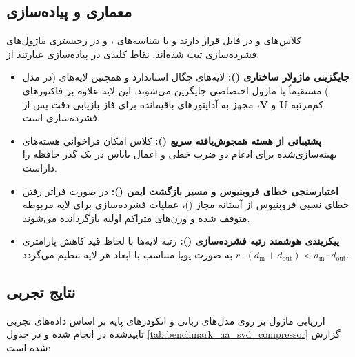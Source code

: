 \subsection{معماری و پیاده‌سازی}
کلاس‌های  و  در فایل  قرار دارند و با شناسه‌های ،  و  در رجیستری ماژول‌های فشرده‌سازی ثبت شده‌اند. نقاط کلیدی در پیاده‌سازی عبارتند از:
\begin{itemize}
    \item \textbf{جایگزینی ماژولار ساختاری ():} لایه‌های چگال استاندارد و همچنین لایه‌های  (در مدل ) مستقیماً با ماژول اختصاصی  جایگزین می‌شوند. این لایه علاوه بر فاکتورهای کم‌مرتبه $\mathbf{U}$ و $\mathbf{V}$، مجهز به آداپتورهای باقیمانده  برای فاز بازیابی دقت پس از فشرده‌سازی است.
    \item \textbf{پشتیبانی از هسته همجوش‌یافته سریع ():} کلاس  امکان فراخوانی هسته‌های بهینه‌سازی‌شده برای ادغام دو ضرب خطی و اعمال بایاس در یک گذر حافظه  را داراست.
    \item \textbf{اعتبارسنجی خطای فروبنیوس و مسیر بازگشت ایمن ():} در صورت فراتر رفتن خطای نسبی فروبنیوس از آستانه مجاز ()، عملیات فشرده‌سازی برای لایه مربوطه متوقف شده و وزن‌های متراکم اولیه بازگردانده می‌شوند.
    \item \textbf{پیکربندی هوشمند رتبه فشرده‌سازی ():} رتبه لایه‌ها با لحاظ قید کاهش پارامتری $r \cdot (d_{\text{in}} + d_{\text{out}}) < d_{\text{in}} \cdot d_{\text{out}}$ به صورت پویا متناسب با ابعاد هر لایه تنظیم می‌گردد.
\end{itemize}

\subsection{نتایج تجربی}
ارزیابی ماژول  بر روی مدل‌های زبانی و انکودرهای پایه بر اساس داده‌های تجربی تاییدشده در  انجام شده و در جدول \ref{tab:benchmark_aa_svd_compressor} گزارش شده است:

